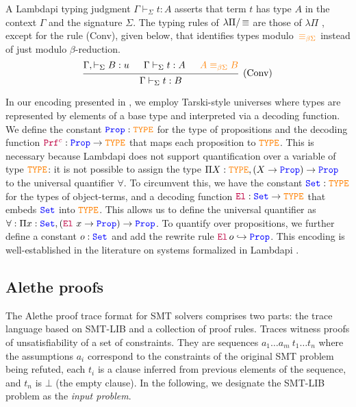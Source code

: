 A Lambdapi typing judgment $\Gamma \vdash_\Sigma t : A$ asserts that term $t$ has type $A$ in the context $\Gamma$ and the signature $\Sigma$.
The typing rules of $\lambda\Pi/\mathop{\equiv}$ are those of  $\lambda\Pi$ \cite[\S 2]{lf}, except for the rule (Conv), given below, that identifies types modulo~$\textcolor{orange}{\equiv_{\beta\Sigma}}$ instead of just modulo $\beta$-reduction. 
\[
    \begin{prooftree}
    \hypo{\Gamma, \vdash_\Sigma B: u}
    \hypo{\Gamma \vdash_\Sigma t: A}
    \hypo{\textcolor{orange}{A \equiv_{\beta\Sigma} B}}
    \infer3[(Conv)]{ \Gamma \vdash_\Sigma t: B }
    \end{prooftree}
\]

In our encoding presented in \cite{ColtellacciMD24},  we employ Tarski-style universes \cite{intuitype} where types are represented by elements of a base type and interpreted via a decoding function.
We define the constant $\textcolor{blue}{\texttt{\upshape{Prop}}}: \textcolor{orange}{\texttt{\upshape{TYPE}}}$ for the type of propositions and the decoding function $\textcolor{purple}{\texttt{\upshape{Prf}}^c}: \textcolor{blue}{\texttt{\upshape{Prop}}} \rightarrow \textcolor{orange}{\texttt{\upshape{TYPE}}}$ that maps each proposition to $\textcolor{orange}{\texttt{\upshape{TYPE}}}$. This is necessary because Lambdapi does not support quantification over a variable of type $\textcolor{orange}{\texttt{\upshape{TYPE}}}$: it is not possible to assign the type $\Pi X : \textcolor{orange}{\texttt{\upshape{TYPE}}},(X \rightarrow \textcolor{blue}{\texttt{\upshape{Prop}}}) \rightarrow \textcolor{blue}{\texttt{\upshape{Prop}}}$ to the universal quantifier $\forall$.
To circumvent this, we have the constant $\textcolor{blue}{\texttt{\upshape{Set}}} : \textcolor{orange}{\texttt{\upshape{TYPE}}}$ for the types of object-terms, and a decoding function ${\textcolor{purple}{\mathop{\texttt{\upshape{El}}}}}: \textcolor{blue}{\texttt{\upshape{Set}}} \rightarrow \textcolor{orange}{\texttt{\upshape{TYPE}}}$ that embeds $\textcolor{blue}{\texttt{\upshape{Set}}}$ into $\textcolor{orange}{\texttt{\upshape{TYPE}}}$.
This allows us to define the universal quantifier as $\forall: \Pi x: \textcolor{blue}{\texttt{\upshape{Set}}}, (\textcolor{purple}{\mathop{\texttt{\upshape{El}}}}~x \rightarrow \textcolor{blue}{\texttt{\upshape{Prop}}}) \rightarrow \textcolor{blue}{\texttt{\upshape{Prop}}}$.
To quantify over propositions, we further define a constant $o: \textcolor{blue}{\texttt{\upshape{Set}}}$ and add the rewrite rule  $\textcolor{purple}{\mathop{\texttt{\upshape{El}}}}\, o \hookrightarrow \textcolor{blue}{\texttt{\upshape{Prop}}}$.
This encoding is well-established in the literature on systems formalized in Lambdapi \cite{blanqui_et_al:LIPIcs.FSCD.2021.20}. 

\subsection{Alethe proofs}
\label{ssect:alethe}

The Alethe proof trace format \cite{alethespec} for SMT solvers comprises two parts: the trace language based on SMT-LIB and a collection of proof rules. Traces witness proofs of unsatisfiability of a set of constraints.
They are sequences $a_1 \dots a_m~t_1 \dots t_n$ where the assumptions $a_i$ correspond to the constraints of the original SMT problem being refuted, each $t_i$ is a clause inferred from previous elements of the sequence, and $t_n$ is $\bot$ (the empty clause).
In the following, we designate the SMT-LIB problem as the \emph{input problem}.

